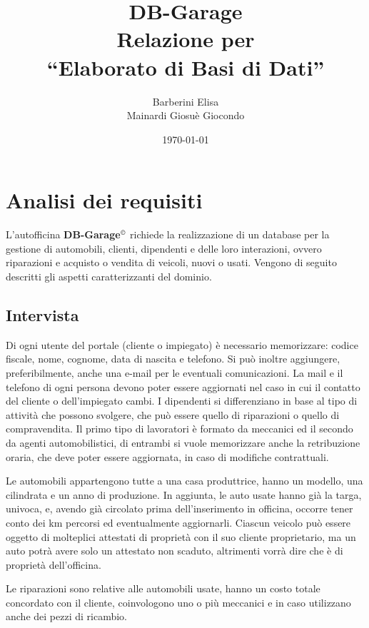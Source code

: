 \documentclass[a4paper,12pt]{report}
\title{\textbf{DB-Garage}\\Relazione per\\``Elaborato di Basi di Dati''}
\author{Barberini Elisa\\Mainardi Giosuè Giocondo}
\date{\today}
\begin{document}
\maketitle

\tableofcontents

\chapter{Analisi dei requisiti}
L'autofficina \textbf{DB-Garage}$^{\copyright}$ richiede la realizzazione di un database per la gestione di automobili,
%
clienti, dipendenti e delle loro interazioni, ovvero riparazioni e acquisto o vendita di veicoli, nuovi o usati. Vengono di seguito 
%
descritti gli aspetti caratterizzanti del dominio.

\section{Intervista}

Di ogni utente del portale (cliente o impiegato) è necessario memorizzare: codice fiscale, nome, cognome,
%
data di nascita e telefono. Si può inoltre aggiungere, preferibilmente, anche una e-mail per le eventuali comunicazioni. 
%
La mail e il telefono di ogni persona devono poter essere aggiornati nel caso in cui il contatto del cliente o dell'impiegato cambi.
%
I dipendenti si differenziano in base al tipo di attività che possono svolgere, che può essere quello di riparazioni o 
%
quello di compravendita.
%
Il primo tipo di lavoratori è formato da meccanici ed il secondo da agenti automobilistici, di entrambi si vuole memorizzare 
%
anche la retribuzione oraria, che deve poter essere aggiornata, in caso di modifiche contrattuali.

Le automobili appartengono tutte a una casa produttrice, hanno un modello, una cilindrata e un anno di produzione.
%
In aggiunta, le auto usate hanno già la targa, univoca, e, avendo già circolato prima dell'inserimento in officina, 
%
occorre tener conto dei km percorsi ed eventualmente aggiornarli.
%
Ciascun veicolo può essere oggetto di molteplici attestati di proprietà con il suo cliente proprietario, 
%
ma un auto potrà avere solo un attestato non scaduto, altrimenti vorrà dire che è di proprietà dell'officina.

Le riparazioni sono relative alle automobili usate, hanno un costo totale concordato con il cliente, coinvologono
%
uno o più meccanici e in caso utilizzano anche dei pezzi di ricambio.
\end{document}

